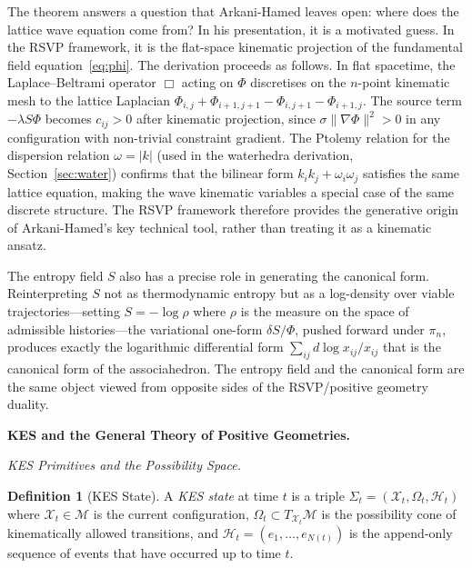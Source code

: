 \documentclass[11pt]{article}
\theoremstyle{plain}
\theoremstyle{definition}
\newtheorem{definition}[theorem]{Definition}
\theoremstyle{remark}
\newcommand{\Phif}{\Phi}
\newcommand{\Sf}{S}
\newcommand{\XKS}{\mathcal{X}}
\newcommand{\OmKS}{\Omega}
\newcommand{\HKS}{\mathcal{H}}
\begin{document}
The theorem answers a question that Arkani-Hamed leaves open: where does the lattice wave equation come from? In his presentation, it is a motivated guess. In the RSVP framework, it is the flat-space kinematic projection of the fundamental field equation~\eqref{eq:phi}. The derivation proceeds as follows. In flat spacetime, the Laplace--Beltrami operator $\Box$ acting on $\Phif$ discretises on the $n$-point kinematic mesh to the lattice Laplacian $\Phif_{i,j} + \Phif_{i+1,j+1} - \Phif_{i,j+1} - \Phif_{i+1,j}$. The source term $-\lambda \Sf \Phif$ becomes $c_{ij} > 0$ after kinematic projection, since $\sigma\|\nabla\Phif\|^2 > 0$ in any configuration with non-trivial constraint gradient. The Ptolemy relation for the dispersion relation $\omega = |k|$ (used in the waterhedra derivation, Section~\ref{sec:water}) confirms that the bilinear form $k_i k_j + \omega_i \omega_j$ satisfies the same lattice equation, making the wave kinematic variables a special case of the same discrete structure. The RSVP framework therefore provides the generative origin of Arkani-Hamed's key technical tool, rather than treating it as a kinematic ansatz.

The entropy field $\Sf$ also has a precise role in generating the canonical form. Reinterpreting $\Sf$ not as thermodynamic entropy but as a log-density over viable trajectories---setting $\Sf = -\log \rho$ where $\rho$ is the measure on the space of admissible histories---the variational one-form $\delta\Sf / \Phif$, pushed forward under $\pi_n$, produces exactly the logarithmic differential form $\sum_{ij} d\log x_{ij} / x_{ij}$ that is the canonical form of the associahedron. The entropy field and the canonical form are the same object viewed from opposite sides of the RSVP/positive geometry duality.

\bigskip\noindent\textbf{KES and the General Theory of Positive Geometries.}
\label{sec:kes}

\medskip\noindent\textit{KES Primitives and the Possibility Space.}

\begin{definition}[KES State]
A \emph{KES state} at time $t$ is a triple $\Sigma_t = (\XKS_t, \OmKS_t, \HKS_t)$ where $\XKS_t \in \mathcal{M}$ is the current configuration, $\OmKS_t \subset T_{\XKS_t}\mathcal{M}$ is the possibility cone of kinematically allowed transitions, and $\HKS_t = (e_1, \ldots, e_{N(t)})$ is the append-only sequence of events that have occurred up to time $t$.
\end{definition}
\end{document}
